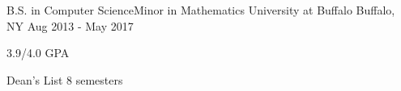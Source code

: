

\begin{cventries}

  \cventry
    {B.S. in Computer Science{\enskip\cdotp\enskip}Minor in Mathematics} %
    {University at Buffalo} %
    {Buffalo, NY} %
    {Aug 2013 - May 2017} %
    {
      \begin{cvitems} %
        \item {3.9/4.0 GPA}
        \item {Dean's List 8 semesters}
      \end{cvitems}
    }



\end{cventries}
